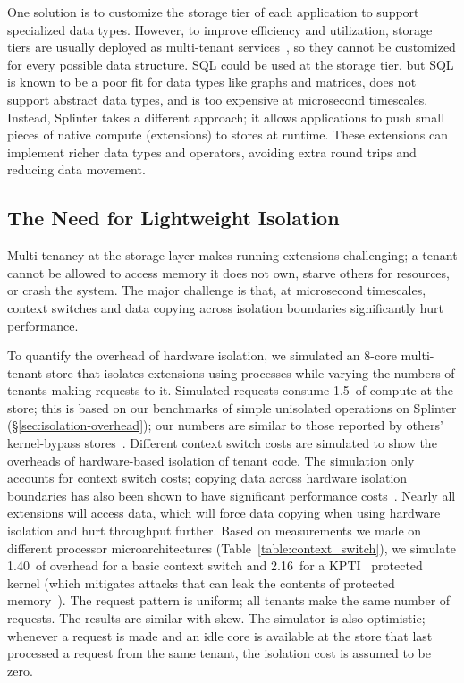 One solution is to customize the storage tier of each application to
support specialized data types. However, to improve efficiency and
utilization, storage tiers are usually deployed as multi-tenant
services~\cite{bigtable-2008,dynamo}, so they cannot be
customized for every possible data structure.
SQL could be used at the storage tier, but SQL is known to be a poor fit for data
types like graphs and matrices, does not support abstract data types,
and is too expensive at microsecond timescales. Instead,
Splinter takes a different approach;
it allows applications to push small pieces of native compute (extensions)
to stores at runtime. These extensions can
implement richer data types and operators, avoiding extra round trips
and reducing data movement.

\subsection{The Need for Lightweight Isolation}
Multi-tenancy at the storage layer makes running extensions challenging;
    a tenant cannot be allowed to access memory it does not own, starve
    others for resources, or crash the system.
The major challenge is that, at microsecond timescales, context switches and
    data copying across isolation boundaries significantly hurt performance.

To quantify the overhead of hardware isolation, we simulated an
  8-core multi-tenant store that isolates extensions using
  processes while varying the numbers of tenants making requests to it.
Simulated requests consume 1.5~\us of compute at the store; this
  is based on our benchmarks of simple unisolated operations on Splinter
  (\S\ref{sec:isolation-overhead}); our numbers are similar to those reported
  by others' kernel-bypass stores~\cite{ramcloud}.
Different context switch costs are simulated to show the
  overheads of hardware-based isolation of tenant code.
The simulation only accounts for context switch costs;
copying data across hardware isolation boundaries has also been shown to have
  significant performance costs~\cite{netbricks-2016}.
Nearly all extensions will access data, which will force data copying
  when using hardware isolation and hurt throughput further.
Based on measurements we made on different processor microarchitectures
  (Table~\ref{table:context_switch}), we simulate
  1.40~\us of overhead for a basic context switch and 2.16~\us for a
  KPTI~\cite{kpti-2018} protected kernel (which mitigates attacks
  that can leak the contents of protected memory~\cite{meltdown-2018}).
The request pattern is uniform;
all tenants make the same number of requests. The results are similar
  with skew.
The simulator is also optimistic; whenever a request is made and an idle core
  is available at the store that last processed a request from the same tenant,
  the isolation cost is assumed to be zero.

